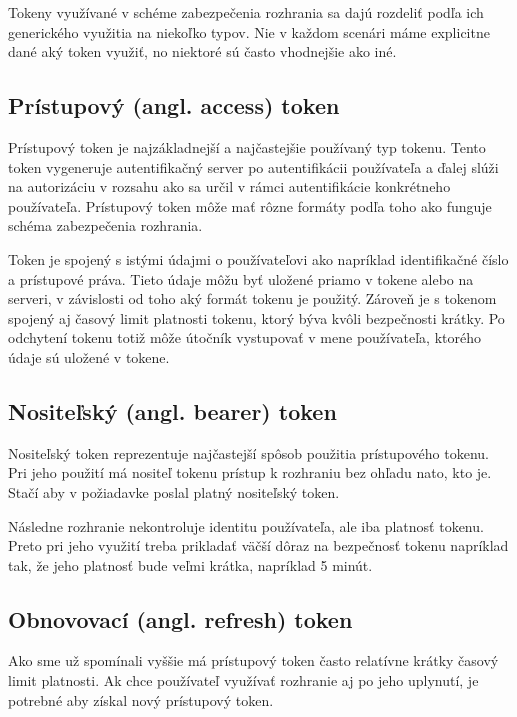 Tokeny využívané v schéme zabezpečenia rozhrania sa dajú rozdeliť podľa ich generického využitia na niekoľko typov. Nie v každom scenári máme explicitne dané aký token využiť, no niektoré sú často vhodnejšie ako iné.

\subsection{Prístupový (angl. access) token}

Prístupový token je najzákladnejší a najčastejšie používaný typ tokenu. Tento token vygeneruje autentifikačný server po autentifikácii používateľa a ďalej slúži na autorizáciu v rozsahu ako sa určil v rámci autentifikácie konkrétneho používateľa. Prístupový token môže mať rôzne formáty podľa toho ako funguje schéma zabezpečenia rozhrania.

Token je spojený s istými údajmi o používateľovi ako napríklad identifikačné číslo a prístupové práva. Tieto údaje môžu byť uložené priamo v tokene alebo na serveri, v závislosti od toho aký formát tokenu je použitý. Zároveň je s tokenom spojený aj časový limit platnosti tokenu, ktorý býva kvôli bezpečnosti krátky. Po odchytení tokenu totiž môže útočník vystupovať v mene používateľa, ktorého údaje sú uložené v tokene.


\subsection{Nositeľský (angl. bearer) token}

Nositeľský token reprezentuje najčastejší spôsob použitia prístupového tokenu. Pri jeho použití má nositeľ tokenu prístup k rozhraniu bez ohľadu nato, kto je. Stačí aby v požiadavke poslal platný nositeľský token.

Následne rozhranie nekontroluje identitu používateľa, ale iba platnosť tokenu. Preto pri jeho využití treba prikladať väčší dôraz na bezpečnosť tokenu napríklad tak, že jeho platnosť bude veľmi krátka, napríklad 5 minút.


\subsection{Obnovovací (angl. refresh) token}

Ako sme už spomínali vyššie má prístupový token často relatívne krátky časový limit platnosti. Ak chce používateľ využívať rozhranie aj po jeho uplynutí, je potrebné aby získal nový prístupový token.

